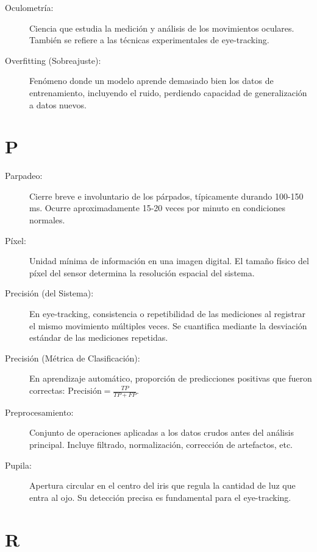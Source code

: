 \begin{description}
    \item[Oculometría:] Ciencia que estudia la medición y análisis de los movimientos oculares. También se refiere a las técnicas experimentales de eye-tracking.
    
    \item[Overfitting (Sobreajuste):] Fenómeno donde un modelo aprende demasiado bien los datos de entrenamiento, incluyendo el ruido, perdiendo capacidad de generalización a datos nuevos.
\end{description}

\section*{P}

\begin{description}
    \item[Parpadeo:] Cierre breve e involuntario de los párpados, típicamente durando 100-150 ms. Ocurre aproximadamente 15-20 veces por minuto en condiciones normales.
    
    \item[Píxel:] Unidad mínima de información en una imagen digital. El tamaño físico del píxel del sensor determina la resolución espacial del sistema.
    
    \item[Precisión (del Sistema):] En eye-tracking, consistencia o repetibilidad de las mediciones al registrar el mismo movimiento múltiples veces. Se cuantifica mediante la desviación estándar de las mediciones repetidas.
    
    \item[Precisión (Métrica de Clasificación):] En aprendizaje automático, proporción de predicciones positivas que fueron correctas: $\text{Precisión} = \frac{TP}{TP + FP}$.
    
    \item[Preprocesamiento:] Conjunto de operaciones aplicadas a los datos crudos antes del análisis principal. Incluye filtrado, normalización, corrección de artefactos, etc.
    
    \item[Pupila:] Apertura circular en el centro del iris que regula la cantidad de luz que entra al ojo. Su detección precisa es fundamental para el eye-tracking.
\end{description}

\section*{R}

